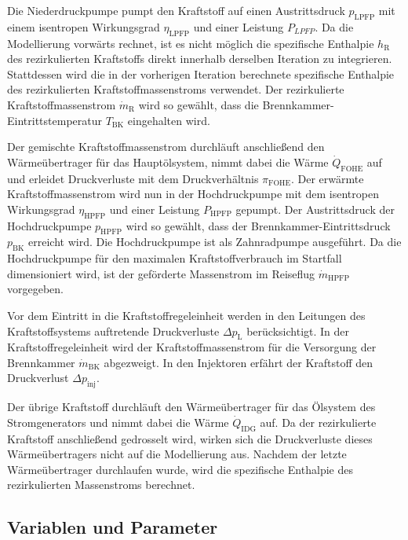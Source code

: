 Die Niederdruckpumpe pumpt den Kraftstoff auf einen Austrittsdruck $p_{\mathrm{LPFP}}$ mit einem isentropen Wirkungsgrad $\eta_{\mathrm{LPFP}}$ und einer Leistung $P_{LPFP}$. Da die Modellierung vorwärts rechnet, ist es nicht möglich die spezifische Enthalpie $h_\mathrm{R}$ des rezirkulierten Kraftstoffs direkt innerhalb derselben Iteration zu integrieren. Stattdessen wird die in der vorherigen Iteration berechnete spezifische Enthalpie des rezirkulierten Kraftstoffmassenstroms verwendet. Der rezirkulierte Kraftstoffmassenstrom $\dot{m}_\mathrm{R}$ wird so gewählt, dass die Brennkammer-Eintrittstemperatur $T_{\mathrm{BK}}$ eingehalten wird. 

Der gemischte Kraftstoffmassenstrom durchläuft anschließend den Wärmeübertrager für das Hauptölsystem, nimmt dabei die Wärme $\dot{Q}_{\mathrm{FOHE}}$ auf und erleidet Druckverluste mit dem Druckverhältnis $\pi_{\mathrm{FOHE}}$. Der erwärmte Kraftstoffmassenstrom wird nun in der Hochdruckpumpe mit dem isentropen Wirkungsgrad $\eta_{\mathrm{HPFP}}$ und einer Leistung $P_{\mathrm{HPFP}}$ gepumpt. Der Austrittsdruck der Hochdruckpumpe $p_{\mathrm{HPFP}}$ wird so gewählt, dass der Brennkammer-Eintrittsdruck $p_{\mathrm{BK}}$ erreicht wird. Die Hochdruckpumpe ist als Zahnradpumpe ausgeführt. Da die Hochdruckpumpe für den maximalen Kraftstoffverbrauch im Startfall dimensioniert wird, ist der geförderte Massenstrom im Reiseflug $\dot{m}_{\mathrm{HPFP}}$ vorgegeben. 

Vor dem Eintritt in die Kraftstoffregeleinheit werden in den Leitungen des Kraftstoffsystems auftretende Druckverluste $\Delta p_{\mathrm{L}}$  berücksichtigt. In der Kraftstoffregeleinheit wird der Kraftstoffmassenstrom für die Versorgung der Brennkammer $\dot{m}_{\mathrm{BK}}$ abgezweigt. In den Injektoren erfährt der Kraftstoff den Druckverlust $\Delta p_{\mathrm{inj}}$. 

Der übrige Kraftstoff durchläuft den Wärmeübertrager für das Ölsystem des Stromgenerators und nimmt dabei die Wärme $\dot{Q}_{\mathrm{IDG}}$ auf. Da der rezirkulierte Kraftstoff anschließend gedrosselt wird, wirken sich die Druckverluste dieses Wärmeübertragers nicht auf die Modellierung aus. Nachdem der letzte Wärmeübertrager durchlaufen wurde, wird die spezifische Enthalpie des rezirkulierten Massenstroms berechnet.

\subsection{Variablen und Parameter}


